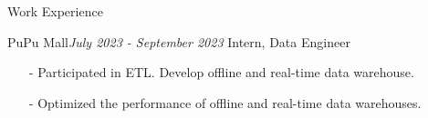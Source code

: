 \documentclass{resume} %
\begin{document}
\begin{rSection}{Work Experience}

\begin{rSubsection}{PuPu Mall}{\em July 2023 - September 2023}
    {Intern, Data Engineer}
    {}
    \item[]
    \begin{itemize}
        \setlength\itemsep{-0.5em}
        \item[-] Participated in ETL. Develop offline and real-time data warehouse.
        \item[-] Optimized the performance of offline and real-time data warehouses.
    \end{itemize}
\end{rSubsection}\textbf{}

\end{rSection}

\end{document}
